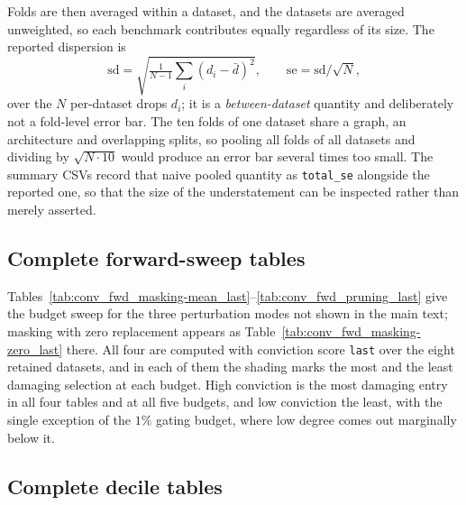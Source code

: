 Folds are then averaged within a dataset, and the datasets are averaged
unweighted, so each benchmark contributes equally regardless of its size. The
reported dispersion is
\[
    \mathrm{sd} = \sqrt{\tfrac{1}{N-1}\textstyle\sum_i (d_i - \bar d)^2},
    \qquad
    \mathrm{se} = \mathrm{sd}/\sqrt{N},
\]
over the $N$ per-dataset drops $d_i$; it is a \emph{between-dataset} quantity and
deliberately not a fold-level error bar. The ten folds of one dataset share a
graph, an architecture and overlapping splits, so pooling all folds of all
datasets and dividing by $\sqrt{N \cdot 10}$ would produce an error bar several
times too small. The summary CSVs record that naive pooled quantity as
\texttt{total\_se} alongside the reported one, so that the size of the
understatement can be inspected rather than merely asserted.

\subsection{Complete forward-sweep tables}
\label{sec:supp_forward}

Tables~\ref{tab:conv_fwd_masking-mean_last}--\ref{tab:conv_fwd_pruning_last}
give the budget sweep for the three perturbation modes not shown in the main
text; masking with zero replacement appears as
Table~\ref{tab:conv_fwd_masking-zero_last} there. All four are computed with
conviction score \texttt{last} over the eight retained datasets, and in each of
them the shading marks the most and the least damaging selection at each budget.
High conviction is the most damaging entry in all four tables and at all five
budgets, and low conviction the least, with the single exception of the $1\%$
gating budget, where low degree comes out marginally below it.







\subsection{Complete decile tables}
\label{sec:supp_decile}

